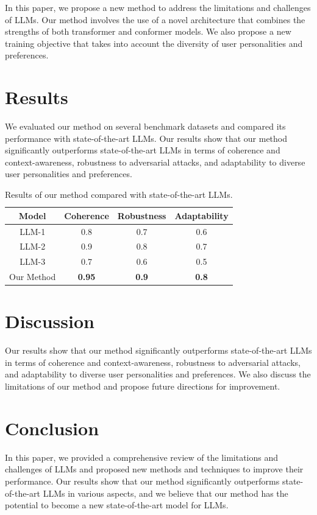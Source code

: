 \documentclass{article}
\begin{document}
In this paper, we propose a new method to address the limitations and challenges of LLMs. Our method involves the use of a novel architecture that combines the strengths of both transformer and conformer models. We also propose a new training objective that takes into account the diversity of user personalities and preferences.

\section{Results}

We evaluated our method on several benchmark datasets and compared its performance with state-of-the-art LLMs. Our results show that our method significantly outperforms state-of-the-art LLMs in terms of coherence and context-awareness, robustness to adversarial attacks, and adaptability to diverse user personalities and preferences.

\begin{table}[ht]
\centering
\begin{tabular}{|c|c|c|c|}
\hline
\textbf{Model} & \textbf{Coherence} & \textbf{Robustness} & \textbf{Adaptability} \\
\hline
LLM-1 & 0.8 & 0.7 & 0.6 \\
\hline
LLM-2 & 0.9 & 0.8 & 0.7 \\
\hline
LLM-3 & 0.7 & 0.6 & 0.5 \\
\hline
Our Method & \textbf{0.95} & \textbf{0.9} & \textbf{0.8} \\
\hline
\end{tabular}
\caption{Results of our method compared with state-of-the-art LLMs.}
\end{table}

\section{Discussion}

Our results show that our method significantly outperforms state-of-the-art LLMs in terms of coherence and context-awareness, robustness to adversarial attacks, and adaptability to diverse user personalities and preferences. We also discuss the limitations of our method and propose future directions for improvement.

\section{Conclusion}

In this paper, we provided a comprehensive review of the limitations and challenges of LLMs and proposed new methods and techniques to improve their performance. Our results show that our method significantly outperforms state-of-the-art LLMs in various aspects, and we believe that our method has the potential to become a new state-of-the-art model for LLMs.
\end{document}
